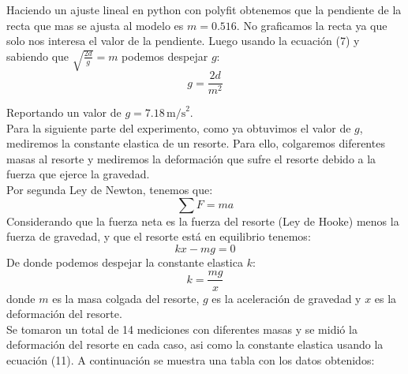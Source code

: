 \documentclass{article}
\begin{document}
Haciendo un ajuste lineal en python con polyfit obtenemos que la pendiente 
de la recta que mas se ajusta al modelo es $m = 0.516$. No graficamos la
recta ya que solo nos interesa el valor de la pendiente. Luego usando la 
ecuación (7) y sabiendo que $\sqrt{\frac{2d}{g}} = m$ podemos despejar $g$:
\begin{equation}
   g = \dfrac{2d}{m^2}
\end{equation}

Reportando un valor de $g = 7.18 \, \text{m/s}^2$. \\

Para la siguiente parte del experimento, como ya obtuvimos el valor de $g$, 
mediremos la constante elastica de un resorte. Para ello, colgaremos 
diferentes masas al resorte y mediremos la deformación que sufre el resorte
debido a la fuerza que ejerce la gravedad. \\

Por segunda Ley de Newton, 
tenemos que:
\begin{equation}
   \sum F = ma
\end{equation}
Considerando que la fuerza neta es la fuerza del resorte (Ley de Hooke) 
menos la fuerza de gravedad, y que el resorte está en equilibrio tenemos:
\begin{equation}
   kx - mg = 0
\end{equation}
De donde podemos despejar la constante elastica $k$:
\begin{equation}
   k = \dfrac{mg}{x}
\end{equation}
donde $m$ es la masa colgada del resorte, $g$ es la aceleración de gravedad
y $x$ es la deformación del resorte. \\

Se tomaron un total de 14 mediciones con diferentes masas y se midió la
deformación del resorte en cada caso, asi como la constante elastica usando
la ecuación (11). A continuación se muestra una tabla con los datos 
obtenidos:
\end{document}
